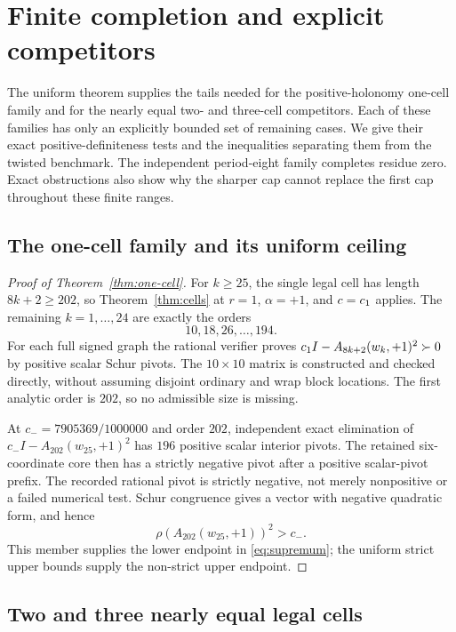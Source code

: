 \section{Finite completion and explicit competitors}
\label{sec:finite}

The uniform theorem supplies the tails needed for the positive-holonomy
one-cell family and for the nearly equal two- and three-cell competitors.
Each of these families has only an explicitly bounded set of remaining
cases. We give their exact positive-definiteness tests and the inequalities
separating them from the twisted benchmark. The independent period-eight
family completes residue zero. Exact obstructions also show why the
sharper cap cannot replace the first cap throughout these finite ranges.

\subsection{The one-cell family and its uniform ceiling}

\begin{proof}[Proof of Theorem~\ref{thm:one-cell}]
For $k\ge25$, the single legal cell has length $8k+2\ge202$, so
Theorem~\ref{thm:cells} at $r=1$, $\alpha=+1$, and $c=c_1$ applies.
The remaining $k=1,\ldots,24$ are exactly the orders
\[
 10,18,26,\ldots,194.
\]
For each full signed graph the rational verifier proves
$c_1 I-A_{8k+2}(w_k,+1)^2\succ0$ by positive scalar Schur pivots.
The $10\times10$ matrix is constructed and checked directly, without
assuming disjoint ordinary and wrap block locations. The first analytic
order is $202$, so no admissible size is missing.

At $c_-=7905369/1000000$ and order $202$, independent exact elimination
of $c_-I-A_{202}(w_{25},+1)^2$ has $196$ positive scalar interior pivots.
The retained six-coordinate core then has a strictly negative pivot after
a positive scalar-pivot prefix. The recorded rational pivot is strictly
negative, not merely nonpositive or a failed numerical test.
Schur congruence gives a vector with negative quadratic form, and hence
\[
 \rho(A_{202}(w_{25},+1))^2>c_-.
\]
This member supplies the lower endpoint in \eqref{eq:supremum}; the
uniform strict upper bounds supply the non-strict upper endpoint.
\end{proof}

\subsection{Two and three nearly equal legal cells}

